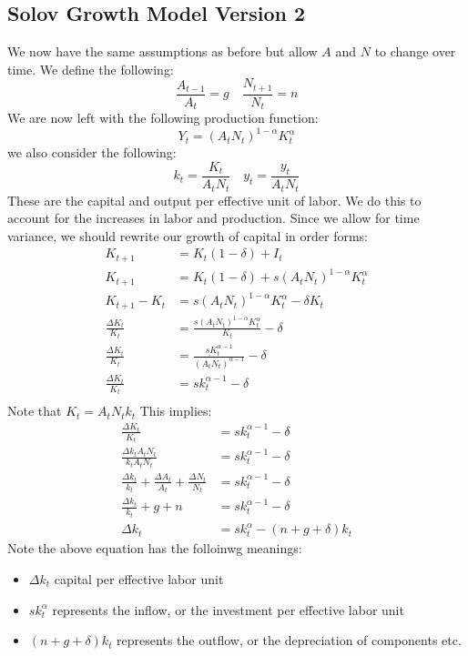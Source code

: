 \documentclass[11pt]{article}
\begin{document}
\subsection{Solov Growth Model Version 2}
We now have the same assumptions as before but allow $A$ and $N$ to change over time. We define the following:
\[
\frac{A_{t-1}}{A_t} = g \quad \frac{N_{t+1}}{N_t} = n
\]
We are now left with the following production function:
\[
Y_t = (A_t N_t)^{1-\alpha} K_t^\alpha
\]
we also consider the following:
\[
k_t = \frac{K_t}{A_t N_t} \quad y_t = \frac{y_t}{A_tN_t} 
\]
These are the capital and output per effective unit of labor. We do this to account for the increases in labor and production. Since we allow for time variance, we should rewrite our growth of capital in order forms:
\begin{align*}
    K_{t+1} &= K_t(1-\delta) + I_t\\
    K_{t+1} &= K_t(1 - \delta) + s(A_t N_t)^{1-\alpha} K_t^\alpha\\
    K_{t+1} - K_t &=  s(A_t N_t)^{1-\alpha} K_t^\alpha - \delta K_t\\
    \frac{\Delta K_t}{K_t} &= \frac{s(A_t N_t)^{1-\alpha} K_t^\alpha}{K_t} - \delta \\
    \frac{\Delta K_t}{K_t} &= \frac{s K_t^{\alpha - 1}}{(A_t N_t)^{\alpha -1}} - \delta \\
    \frac{\Delta K_t }{K_t} &= s k_t^{\alpha -1} - \delta\\
\end{align*}
Note that $K_t = A_t N_t k_t$ This implies:
\begin{align*}
    \frac{\Delta K_t }{K_t} &= s k_t^{\alpha -1} - \delta\\
    \frac{\Delta k_t A_t N_t}{k_t A_t N_t} &= s k^{\alpha - 1}_t - \delta \\
    \frac{\Delta k_t}{k_t} + \frac{\Delta A_t}{A_t} + \frac{\Delta N_t}{N_t} &= sk_t^{\alpha - 1} - \delta\\
    \frac{\Delta k_t}{k_t} + g + n &= sk_t^{\alpha - 1} - \delta\\
    \Delta k_t &= sk_t^\alpha - (n + g + \delta) k_t
\end{align*}
Note the above equation has the folloinwg meanings:
\begin{itemize}
    \item $\Delta k_t$ capital per effective labor unit 
    \item $sk_t^\alpha$ represents the inflow, or the investment per effective labor unit 
    \item $(n+g+\delta)k_t$ represents the outflow, or the depreciation of components etc. 
\end{itemize}
\end{document}
